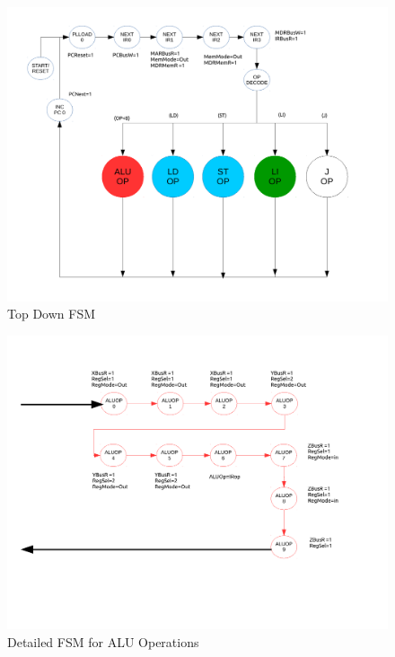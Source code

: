 \documentclass[conference]{IEEEtran}
\begin{document}
\clearpage

\begin{figure}[!t]
\centering
\includegraphics[width=\textwidth]{ControlFSMp1.pdf}
\caption{Top Down FSM}
\label{fig_sim}
\end{figure}


\clearpage

\begin{figure}[!t]
\centering
\includegraphics[width=\textwidth]{ControlFSMp2.pdf}
\caption{Detailed FSM for ALU Operations}
\label{fig_sim}
\end{figure}

\clearpage
\end{document}
